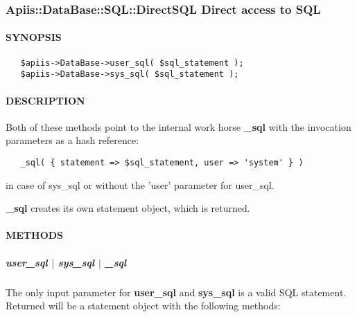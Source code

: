 \subsubsection{Apiis::DataBase::SQL::DirectSQL  Direct access to SQL\label{Apiis::DataBase::SQL::DirectSQL_Direct_access_to_SQL}}




\paragraph*{SYNOPSIS\label{Apiis::DataBase::SQL::DirectSQL_Direct_access_to_SQL_SYNOPSIS}}
\begin{verbatim}
   $apiis->DataBase->user_sql( $sql_statement );
   $apiis->DataBase->sys_sql( $sql_statement );
\end{verbatim}
\paragraph*{DESCRIPTION\label{Apiis::DataBase::SQL::DirectSQL_Direct_access_to_SQL_DESCRIPTION}}


Both of these methods point to the internal work horse \textbf{\_sql} with the
invocation parameters as a hash reference:

\begin{verbatim}
   _sql( { statement => $sql_statement, user => 'system' } )
\end{verbatim}


in case of sys\_sql or without the 'user' parameter for user\_sql.



\textbf{\_sql} creates its own statement object, which is returned.

\paragraph*{METHODS\label{Apiis::DataBase::SQL::DirectSQL_Direct_access_to_SQL_METHODS}}
\subparagraph*{user\_sql $|$ sys\_sql $|$ \_sql\label{Apiis::DataBase::SQL::DirectSQL_Direct_access_to_SQL_user_sql_sys_sql_sql}}


The only input parameter for \textbf{user\_sql} and \textbf{sys\_sql} is a valid SQL
statement. Returned will be a statement object with the following methods:



